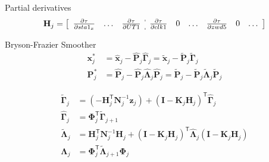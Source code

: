 \documentclass[14pt,table,t, c]{beamer}
\begin{document}
\begin{frame}{Partial derivatives}
\begin{align*}
\mathbf{H}_j =
\left[\begin{array}{ccc:cccccc}
\frac{\partial \tau}{\partial sta1_x} & \ldots & \frac{\partial\tau}{\partial UT1} &
\frac{\partial \tau}{\partial clk1} & 0 & \ldots & \frac{\partial \tau}{\partial zwd5} & 0 &\ldots \\
\end{array}\right]
\end{align*}
\end{frame}

\begin{frame}{Bryson-Frazier Smoother}
\begin{align*}
\mathbf{x}_j^\ast &= \hat{\mathbf{x}}_j - \hat{\mathbf{P}}_j \hat{\mathbf{\Gamma}}_j = \tilde{\mathbf{x}}_j -
\tilde{\mathbf{P}}_j \tilde{\mathbf{\Gamma}}_j \\
\mathbf{P}_j^\ast &= \hat{\mathbf{P}}_j - \hat{\mathbf{P}}_j \hat{\mathbf{\Lambda}}_j \hat{\mathbf{P}}_j =
\tilde{\mathbf{P}}_j - \tilde{\mathbf{P}}_j \tilde{\mathbf{\Lambda}}_j \tilde{\mathbf{P}}_j 
\end{align*}

\begin{align*}
\tilde{\mathbf{\Gamma}}_j &= (-\mathbf{H}_j^\mathsf{T}\mathbf{N}_j^{-1}\mathbf{z}_j) + (\mathbf{I} -
\mathbf{K}_j\mathbf{H}_j)^\mathsf{T} \hat{\mathbf{\Gamma}}_j\\
\hat{\mathbf{\Gamma}}_j &= \mathbf{\Phi}_j^\mathsf{T} \tilde{\mathbf{\Gamma}}_{j+1}\\
\tilde{\mathbf{\Lambda}}_j &= \mathbf{H}_j^\mathsf{T}\mathbf{N}_j^{-1}\mathbf{H}_j + (\mathbf{I} -
\mathbf{K}_j\mathbf{H}_j)^\mathsf{T}\hat{\mathbf{\Lambda}}_j(\mathbf{I} - \mathbf{K}_j\mathbf{H}_j)\\
\hat{\mathbf{\Lambda}}_j &= \mathbf{\Phi}_j^\mathsf{T} \tilde{\mathbf{\Lambda}}_{j+1} \mathbf{\Phi}_j
\end{align*}


\end{frame}
\end{document}
